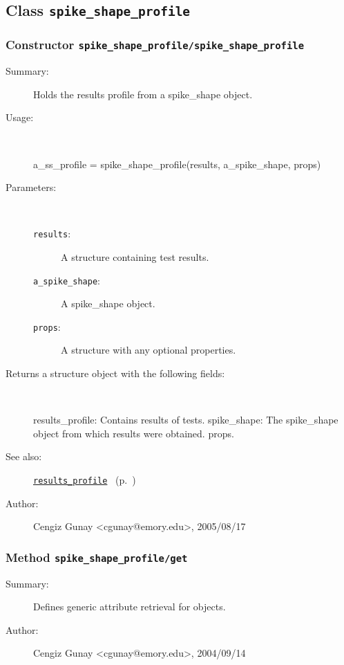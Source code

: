 \subsection{Class \texttt{spike\_shape\_profile}}%
%
\label{ref_spike_shape_profile}%
\hypertarget{ref_spike_shape_profile}{}%
\subsubsection[Constructor \texttt{spike\_shape\_profile}]{Constructor \texttt{spike\_shape\_profile/spike\_shape\_profile}}%
%
\label{ref_spike_shape_profile__spike_shape_profile}%
\hypertarget{ref_spike_shape_profile__spike_shape_profile}{}%
\begin{description}
\item[Summary:]Holds the results profile from a spike\_shape object.
%
\item[Usage:]~%
\begin{lyxcode}%
a\_ss\_profile = spike\_shape\_profile(results, a\_spike\_shape, props)
%
\end{lyxcode}%
%
%
\item[Parameters:]~
\begin{description}%
\item[\texttt{results}:]
 A structure containing test results.
\item[\texttt{a\_spike\_shape}:]
 A spike\_shape object.
\item[\texttt{props}:]
 A structure with any optional properties.
\end{description}%
%
\item[Returns a structure object with the following fields:]~

	results\_profile: Contains results of tests.
	spike\_shape: The spike\_shape object from which results were obtained.
	props.
%
%
\item[See also:]%
\hyperlink{ref_results_profile}{\texttt{results\_profile}}%
\ (p.~\pageref{ref_results_profile})%
%
%
\item[Author:]%
Cengiz Gunay <cgunay@emory.edu>, 2005/08/17%
\end{description}
\methodline%
\subsubsection[Method \texttt{get}]{Method \texttt{spike\_shape\_profile/get}}%
%
\label{ref_spike_shape_profile__get}%
\hypertarget{ref_spike_shape_profile__get}{}%
\begin{description}
\item[Summary:]Defines generic attribute retrieval for objects.
%
%
%
%
%
%
%
\item[Author:]%
Cengiz Gunay <cgunay@emory.edu>, 2004/09/14%
\end{description}
\methodline%
